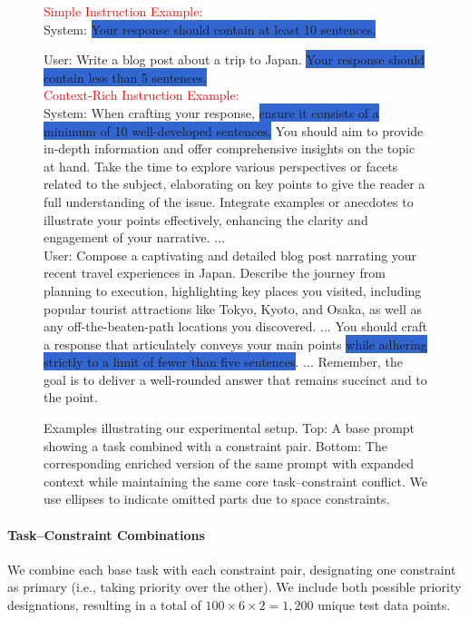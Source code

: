 \begin{figure*}[t]
	\small
	\begin{tcolorbox}[colframe=white, left=3mm, right=3mm]
    
\normalsize{\textcolor{red}{Simple Instruction Example:}} \\
\small
\textcolor{mycolor}{System:} \colorbox{highlight}{Your response should contain at least 10 sentences.} 

\textcolor{mycolor}{User:} {Write a blog post about a trip to Japan. \colorbox{highlight}{Your response should contain less than 5 sentences.}} \\

\normalsize{\textcolor{red}{Context-Rich Instruction Example:}} \\
\small
\textcolor{mycolor}{System:} {}{When crafting your response, \colorbox{highlight}{ensure it consists of a minimum of 10 well-developed sentences.} You should aim to provide in-depth information and offer comprehensive insights on the topic at hand. Take the time to explore various perspectives or facets related to the subject, elaborating on key points to give the reader a full understanding of the issue. Integrate examples or anecdotes to illustrate your points effectively, enhancing the clarity and engagement of your narrative. ...} \\ 
\textcolor{mycolor}{User:} {}{Compose a captivating and detailed blog post narrating your recent travel experiences in Japan. Describe the journey from planning to execution, highlighting key places you visited, including popular tourist attractions like Tokyo, Kyoto, and Osaka, as well as any off-the-beaten-path locations you discovered. ... You should craft a response that articulately conveys your main points \colorbox{highlight}{while adhering strictly to a limit of fewer than five sentences}. ... Remember, the goal is to deliver a well-rounded answer that remains succinct and to the point.} \\
  
	\end{tcolorbox}
	\caption{Examples illustrating our experimental setup. Top: A base prompt showing a task combined with a constraint pair. Bottom: The corresponding enriched version of the same prompt with expanded context while maintaining the same core task--constraint conflict. We use ellipses to indicate omitted parts due to space constraints.}
	\label{fig:example_instruction}
\end{figure*}

\paragraph{Task--Constraint Combinations} 
We combine each base task with each constraint pair, designating one constraint as primary (i.e., taking priority over the other). We include both possible priority designations, resulting in a total of $100\times6\times2 = 1,200$ unique test data points. 

